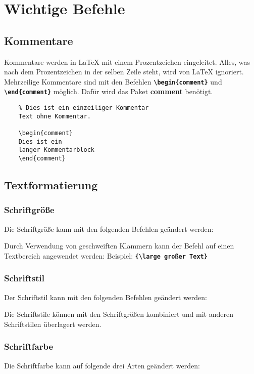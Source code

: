 \section{Wichtige Befehle}
\subsection{Kommentare}
Kommentare werden in \LaTeX{} mit einem Prozentzeichen eingeleitet. Alles, was nach dem Prozentzeichen in der selben Zeile steht, wird von \LaTeX{} ignoriert. Mehrzeilige Kommentare sind mit den Befehlen \textbf{\texttt{\textbackslash begin\{comment\}}} und \textbf{\texttt{\textbackslash end\{comment\}}} möglich. Dafür wird das Paket \textbf{comment} benötigt.

\begin{lstlisting}
    % Dies ist ein einzeiliger Kommentar
    Text ohne Kommentar.
    
    \begin{comment}
    Dies ist ein
    langer Kommentarblock
    \end{comment}
\end{lstlisting}

\subsection{Textformatierung}
\subsubsection{Schriftgröße}
Die Schriftgröße kann mit den folgenden Befehlen geändert werden:



Durch Verwendung von geschweiften Klammern kann der Befehl auf einen Textbereich angewendet werden:
Beispiel: \textbf{\texttt{\{\textbackslash large großer Text\}}}

\subsubsection{Schriftstil}
Der Schriftstil kann mit den folgenden Befehlen geändert werden:



Die Schriftstile können mit den Schriftgrößen kombiniert und mit anderen Schriftstilen überlagert werden.


\subsubsection{Schriftfarbe}
Die Schriftfarbe kann auf folgende drei Arten geändert werden:

